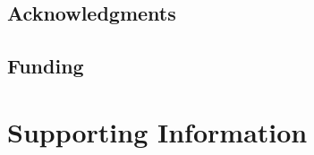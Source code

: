 \documentclass[11pt,oneside,letterpaper]{article}
\begin{document}
\subsection*{Acknowledgments} 

\subsection*{Funding} 




\pagebreak

\setcounter{figure}{0}
\setcounter{table}{0}
\setcounter{page}{1}
\renewcommand{\thefigure}{S\arabic{figure}}
\renewcommand{\thetable}{S\arabic{table}}
\renewcommand{\thepage}{S\arabic{page}}

\section*{Supporting Information}

\pagebreak
\end{document}
